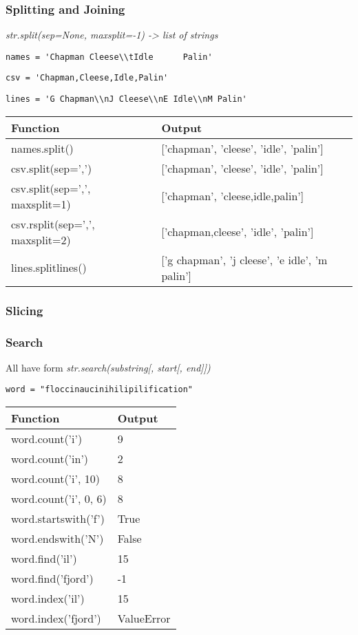 \documentclass{beamer}
\begin{document}
%
%
\begin{frame}
  \frametitle{Splitting and Joining}

  \textit{str.split(sep=None, maxsplit=-1) -> list of strings}

  \lstinline{names = 'Chapman Cleese\\tIdle      Palin'}

  \lstinline{csv = 'Chapman,Cleese,Idle,Palin'}

  \lstinline{lines = 'G Chapman\\nJ Cleese\\nE Idle\\nM Palin'}
 
  \begin{table}
    \begin{tabular}{l | l}
    Function & Output \\
    \hline
    names.split() & ['chapman', 'cleese', 'idle', 'palin'] \\
    csv.split(sep=',') & ['chapman', 'cleese', 'idle', 'palin'] \\
    csv.split(sep=',', maxsplit=1) & ['chapman', 'cleese,idle,palin'] \\
    csv.rsplit(sep=',', maxsplit=2) & ['chapman,cleese', 'idle', 'palin'] \\
    lines.splitlines() & ['g chapman', 'j cleese', 'e idle', 'm palin']
    \end{tabular}
  \end{table}
\end{frame}


%
%
\begin{frame}
  \frametitle{Slicing}

\end{frame}

%
%
\begin{frame}
  \frametitle{Search}
  All have form \textit{str.search(substring[, start[, end]])}
  
  \lstinline{word = "floccinaucinihilipilification"}

  \begin{table}
    \begin{tabular}{l | l}
    Function & Output \\
    \hline
    word.count('i') & 9 \\
    word.count('in') & 2 \\
    word.count('i', 10) & 8 \\
    word.count('i', 0, 6) & 8 \\
    \hline
    word.startswith('f') & True \\
    word.endswith('N') & False \\
    \hline
    word.find('il') & 15 \\
    word.find('fjord') & -1 \\
    \hline
    word.index('il') & 15 \\
    word.index('fjord') & ValueError
   \end{tabular}
  \end{table}
\end{frame}
\end{document}
